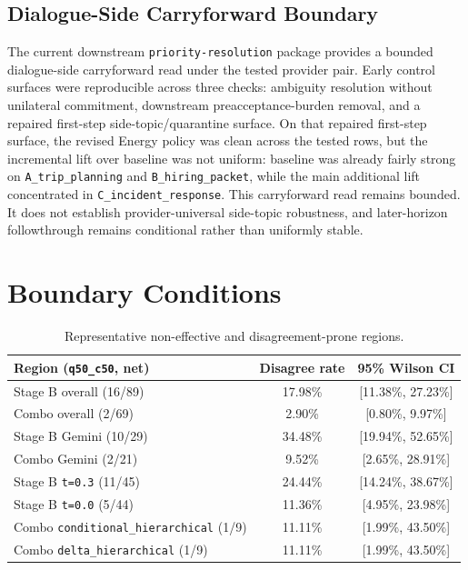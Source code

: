 \documentclass[11pt,a4paper]{article}
\begin{document}
\subsection{Dialogue-Side Carryforward Boundary}
\label{sec:dialoguecarryforward}

The current downstream \texttt{priority-resolution} package provides a bounded dialogue-side carryforward read under the tested provider pair. Early control surfaces were reproducible across three checks: ambiguity resolution without unilateral commitment, downstream preacceptance-burden removal, and a repaired first-step side-topic/quarantine surface. On that repaired first-step surface, the revised Energy policy was clean across the tested rows, but the incremental lift over baseline was not uniform: baseline was already fairly strong on \texttt{A\_trip\_planning} and \texttt{B\_hiring\_packet}, while the main additional lift concentrated in \texttt{C\_incident\_response}. This carryforward read remains bounded. It does not establish provider-universal side-topic robustness, and later-horizon followthrough remains conditional rather than uniformly stable.

\section{Boundary Conditions}
\label{sec:boundaries}

\begin{table}[ht]
\centering
\small
\begin{tabularx}{\textwidth}{@{}Xcc@{}}
\toprule
Region (\texttt{q50\_c50}, net) & Disagree rate & 95\% Wilson CI \\
\midrule
Stage B overall (16/89) & 17.98\% & [11.38\%, 27.23\%] \\
Combo overall (2/69) & 2.90\% & [0.80\%, 9.97\%] \\
Stage B Gemini (10/29) & 34.48\% & [19.94\%, 52.65\%] \\
Combo Gemini (2/21) & 9.52\% & [2.65\%, 28.91\%] \\
Stage B \texttt{t=0.3} (11/45) & 24.44\% & [14.24\%, 38.67\%] \\
Stage B \texttt{t=0.0} (5/44) & 11.36\% & [4.95\%, 23.98\%] \\
Combo \texttt{conditional\_hierarchical} (1/9) & 11.11\% & [1.99\%, 43.50\%] \\
Combo \texttt{delta\_hierarchical} (1/9) & 11.11\% & [1.99\%, 43.50\%] \\
\bottomrule
\end{tabularx}
\caption{Representative non-effective and disagreement-prone regions.}
\label{tab:boundary_regions}
\end{table}
\end{document}
